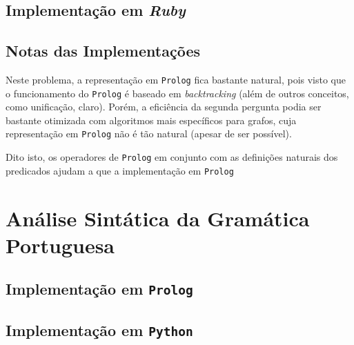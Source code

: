 \documentclass[12pt,a4paper,oneside]{article}
\begin{document}
\subsection{Implementação em \textit{Ruby}}

\lipsum[1]

\lipsum[2]

\lipsum[3]

\subsection{Notas das Implementações}

Neste problema, a representação em \texttt{Prolog} fica bastante
natural, pois visto que o funcionamento do \texttt{Prolog} é baseado
em \textit{backtracking} (além de outros conceitos, como unificação,
claro). Porém, a eficiência da segunda pergunta podia ser bastante
otimizada com algoritmos mais específicos para grafos, cuja
representação em \texttt{Prolog} não é tão natural (apesar de ser
possível).

Dito isto, os operadores de \texttt{Prolog} em conjunto com as
definições naturais dos predicados ajudam a que a implementação em
\texttt{Prolog}


\section{Análise Sintática da Gramática Portuguesa}
\label{sec:sin}

\lipsum[1]

\subsection{Implementação em \texttt{Prolog}}

\lipsum[1]

\lipsum[2]

\lipsum[3]

\subsection{Implementação em \texttt{Python}}

\lipsum[1]

\lipsum[2]

\lipsum[3]
\end{document}
